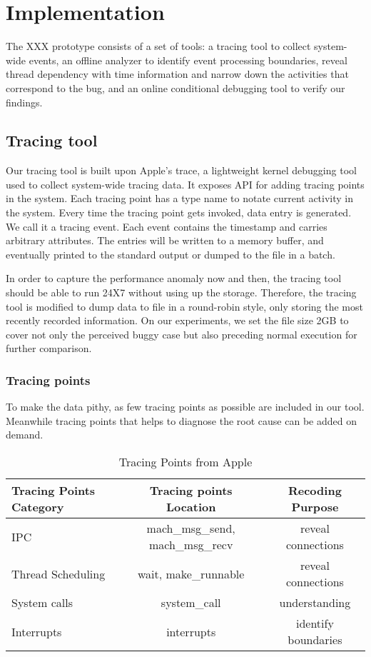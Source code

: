\section{Implementation}
The XXX prototype consists of a set of tools: a tracing tool to collect system-wide events, an offline analyzer to identify event processing boundaries, reveal thread dependency with time information and narrow down the activities that correspond to the bug, and an online conditional debugging tool to verify our findings.
\par
\subsection{Tracing tool}
Our tracing tool is built upon Apple's trace, a lightweight kernel debugging tool used to collect system-wide tracing data.
It exposes API for adding tracing points in the system.
Each tracing point has a type name to notate current activity in the system.
Every time the tracing point gets invoked, data entry is generated.
We call it a tracing event.
Each event contains the timestamp and carries arbitrary attributes.
The entries will be written to a memory buffer, and eventually printed to the standard output or dumped to the file in a batch.\par
In order to capture the performance anomaly now and then, the tracing tool should be able to run 24X7 without using up the storage.
Therefore, the tracing tool is modified to dump data to file in a round-robin style, only storing the most recently recorded information.
On our experiments, we set the file size 2GB to cover not only the perceived buggy case but also preceding normal execution for further comparison.\par
\subsubsection{Tracing points}
To make the data pithy, as few tracing points as possible are included in our tool.
Meanwhile tracing points that helps to diagnose the root cause can be added on demand.
\begin{table}[h]
\begin{adjustbox}{width=\columnwidth, center}
\begin{tabular}{|l|c|c|}
\hline
Tracing Points Category & Tracing points Location & Recoding Purpose\\
\hline
\hline
IPC & mach\_msg\_send, mach\_msg\_recv & reveal connections\\
\hline
Thread Scheduling & wait, make\_runnable & reveal connections\\
\hline
System calls & system\_call & understanding\\
\hline
Interrupts & interrupts & identify boundaries\\
\hline
\end{tabular}
\end{adjustbox}
\caption{Tracing Points from Apple}
\label{tab:Tracing Points from Apple}
\end{table}

